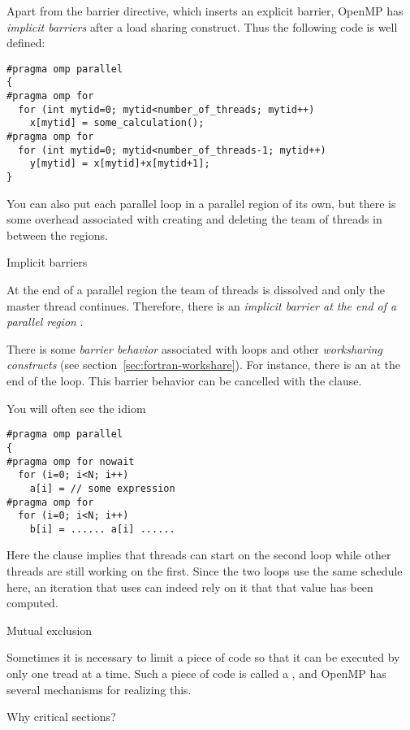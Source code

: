 Apart from the barrier directive, which inserts an explicit barrier,
OpenMP has \emph{implicit barriers} after
a load sharing construct. Thus the following code is well defined:
\begin{lstlisting}
#pragma omp parallel 
{
#pragma omp for
  for (int mytid=0; mytid<number_of_threads; mytid++)
    x[mytid] = some_calculation();
#pragma omp for
  for (int mytid=0; mytid<number_of_threads-1; mytid++)
    y[mytid] = x[mytid]+x[mytid+1];
}
\end{lstlisting}

You can also put each parallel loop in a parallel region of its own,
but there is some overhead associated with creating and deleting the
team of threads in between the regions.

 {Implicit barriers}

At the end of a parallel region the team of threads is dissolved and
only the master thread continues. Therefore, there is an
\emph{implicit barrier at the end of a parallel region}%
.

There is some \emph{barrier behavior} associated with  loops and other
\emph{worksharing constructs} (see section~\ref{sec:fortran-workshare}).  For instance, there
is an  at the end of the loop. This
barrier behavior can be cancelled with the 
clause.

You will often see the idiom
\begin{lstlisting}
#pragma omp parallel
{
#pragma omp for nowait
  for (i=0; i<N; i++)
    a[i] = // some expression
#pragma omp for
  for (i=0; i<N; i++)
    b[i] = ...... a[i] ......
\end{lstlisting}
Here the  clause implies that threads can start on the second loop
while other threads are still working on the first. Since the two loops use the same
schedule here, an iteration that uses  can indeed rely on it that that 
value has been computed.

 {Mutual exclusion}

Sometimes it is necessary to limit a piece of code
so that it can be executed by only one tread at a time.
Such a piece of code is called a , and
OpenMP has several mechanisms for realizing this.

 {Why critical sections?}


